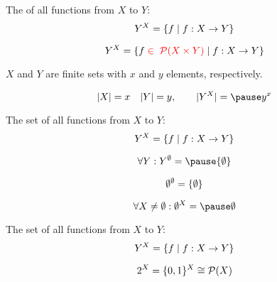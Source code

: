 % 
% 

\begin{frame}
  \begin{definition}
    The  of all functions from $X$ to $Y$:
    \[
      Y^{X} = \{f \mid f: X \to Y\}
    \]
  \end{definition}

  \pause
  \[
    Y^{X} = \{f \;\textcolor{red}{\in\; \mathcal{P}(X \times Y)} \mid f: X \to Y\}
  \]

  \pause
  \vspace{0.50cm}
  \begin{center}
    $X$ and $Y$ are finite sets with $x$ and $y$ elements, respectively.
  \end{center}
  \[
    |X| = x \quad |Y| = y, \qquad |Y^{X}| = \pause y^{x}
  \]
\end{frame}

\begin{frame}
  \begin{definition}
    The set of all functions from $X$ to $Y$:
    \[
      Y^{X} = \{f \mid f: X \to Y\}
    \]
  \end{definition}

  \[
    \forall Y: Y^{\emptyset} = \pause \set{\emptyset}
  \]

  \pause
  \vspace{-0.30cm}
  \[
    \emptyset^{\emptyset} = \{\emptyset\}
  \]

  \pause
  \[
    \forall X \neq \emptyset: \emptyset^{X} = \pause \emptyset
  \]
\end{frame}

\begin{frame}
  \begin{definition}
    The set of all functions from $X$ to $Y$:
    \[
      Y^{X} = \{f \mid f: X \to Y\}
    \]
  \end{definition}

  \[
    2^{X} = \{0, 1\}^{X} \cong \mathcal{P}(X)
  \]

\end{frame}

